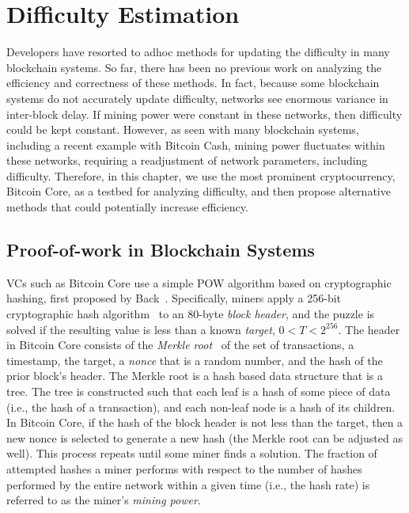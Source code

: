\chapter{Difficulty Estimation}
\label{difficulty-estimation}

Developers have resorted to adhoc methods for updating the difficulty in many blockchain systems. So far, there has been no previous work on analyzing the efficiency and correctness of these methods. In fact, because some blockchain systems do not accurately update difficulty, networks see enormous variance in inter-block delay. If mining power were constant in these networks, then difficulty could be kept constant. However, as seen with many blockchain systems, including a recent example with Bitcoin Cash, mining power fluctuates within these networks, requiring a readjustment of network parameters, including difficulty. Therefore, in this chapter, we use the most prominent cryptocurrency, Bitcoin Core, as a testbed for analyzing difficulty, and then propose alternative methods that could potentially increase efficiency. 

\section{Proof-of-work in Blockchain Systems}
VCs such as Bitcoin Core use a simple POW algorithm based on cryptographic
hashing, first proposed by Back~\cite{Back:2002}.
Specifically, miners apply a 256-bit cryptographic hash algorithm~\cite{hashcash} to
an 80-byte {\em block header}, and the puzzle is solved if the
resulting value is less than a known {\em target}, $0<T<2^{256}$. The
header in Bitcoin Core consists of the {\em Merkle root}~\cite{Merkle:1987} of the set of
transactions, a timestamp, the target, a {\em
  nonce} that is a random number, and the hash of the prior block's header. The Merkle root is a hash based data structure that is a tree. The tree is constructed such that each leaf is a hash of some piece of data (i.e., the hash of a transaction), and each non-leaf node is a hash of its children.
In Bitcoin Core, if the hash of the block header is not less than the target, then a new nonce is selected to generate a new hash (the Merkle root can be adjusted as well). This process repeats
until some miner finds a solution. The fraction of attempted hashes a miner performs with respect to the number of hashes performed by the entire network within a given time (i.e., the hash rate) is referred to as the miner's {\em mining power}.
  
